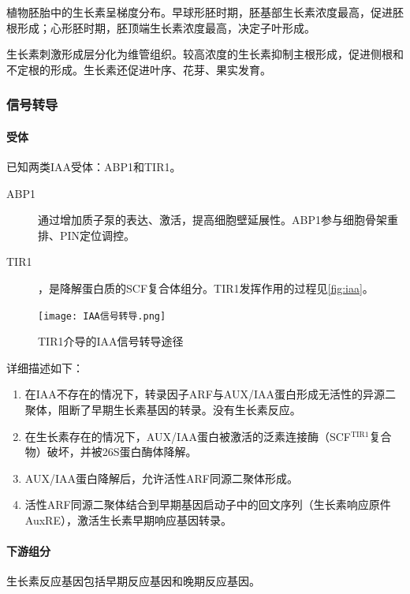 植物胚胎中的生长素呈梯度分布。早球形胚时期，胚基部生长素浓度最高，促进胚根形成；心形胚时期，胚顶端生长素浓度最高，决定子叶形成。

生长素刺激形成层分化为维管组织。较高浓度的生长素抑制主根形成，促进侧根和不定根的形成。生长素还促进叶序、花芽、果实发育。

\subsubsection{信号转导}

\paragraph{受体}

已知两类IAA受体：ABP1和TIR1。

\begin{description}
	\item[ABP1] 通过增加质子泵的表达、激活，提高细胞壁延展性。ABP1参与细胞骨架重排、PIN定位调控。
	\item[TIR1] ，是降解蛋白质的SCF复合体组分。TIR1发挥作用的过程见\autoref{fig:iaa}。
\end{description}

\begin{figure}[htbp]
	\centering
	\texttt{[image: IAA信号转导.png]}
	\caption{TIR1介导的IAA信号转导途径}
	\label{fig:iaa}
\end{figure}

详细描述如下：

\begin{enumerate}
	\item 在IAA不存在的情况下，转录因子ARF与AUX/IAA蛋白形成无活性的异源二聚体，阻断了早期生长素基因的转录。没有生长素反应。
	\item 在生长素存在的情况下，AUX/IAA蛋白被激活的泛素连接酶（SCF$^{\text{TIR1}}$复合物）破坏，并被26S蛋白酶体降解。
	\item AUX/IAA蛋白降解后，允许活性ARF同源二聚体形成。
	\item 活性ARF同源二聚体结合到早期基因启动子中的回文序列（生长素响应原件AuxRE），激活生长素早期响应基因转录。
\end{enumerate}

\paragraph{下游组分}

生长素反应基因包括早期反应基因和晚期反应基因。

